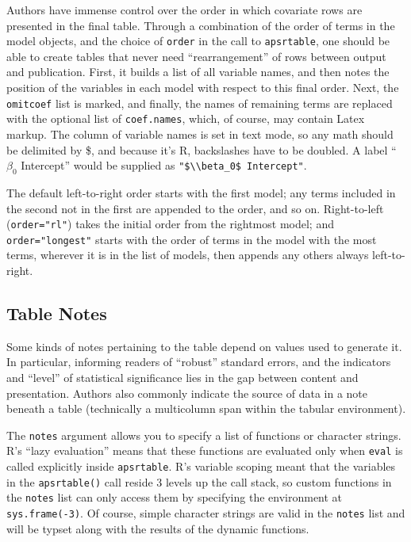 \documentclass[10pt]{article} %
\begin{document}
Authors have immense control over the order in which covariate rows are presented in the final table. Through a combination of the order of terms in the model objects, and the choice of \verb|order| in the call to \verb|apsrtable|, one should be able to create tables that never need ``rearrangement'' of rows between output and publication. First, it builds a list of all variable names, and then notes the position of the variables in each model with respect to this final order. Next, the \verb|omitcoef| list is marked, and finally, the names of remaining terms are replaced with the optional list of \verb|coef.names|, which, of course, may contain Latex
 markup. The column of variable names is set in text mode, so any math should be delimited by \$, and because it's R, backslashes have to be doubled. A label ``$\beta_0$ Intercept'' would be supplied as \verb|"$\\beta_0$ Intercept"|.

The default left-to-right order starts with the first model; any terms included in the second not in the first are appended to the order, and so on. Right-to-left (\verb|order="rl"|) takes the initial order from the rightmost model; and \verb|order="longest"| starts with the order of terms in the model with the most terms, wherever it is in the list of models, then appends any others always left-to-right.

\subsection{Table Notes}
\label{sec:table-notes}

Some kinds of notes pertaining to the table depend on values used to generate it. In particular, informing readers of ``robust'' standard errors, and the indicators and ``level'' of statistical significance lies in the gap between content and presentation. Authors also commonly indicate the source of data in a note beneath a table (technically a multicolumn span within the tabular environment). 

The \verb|notes| argument allows you to specify a list of functions or character strings. R's ``lazy evaluation'' means that these functions are evaluated only when \verb|eval| is called explicitly inside \verb|apsrtable|. R's variable scoping meant that the variables in the \verb|apsrtable()| call reside 3 levels up the call stack, so custom functions in the \verb|notes| list can only access them by specifying the environment at \verb|sys.frame(-3)|. Of course, simple character strings are valid in the \verb|notes| list and will be typset along with the results of the dynamic functions.
\end{document}
